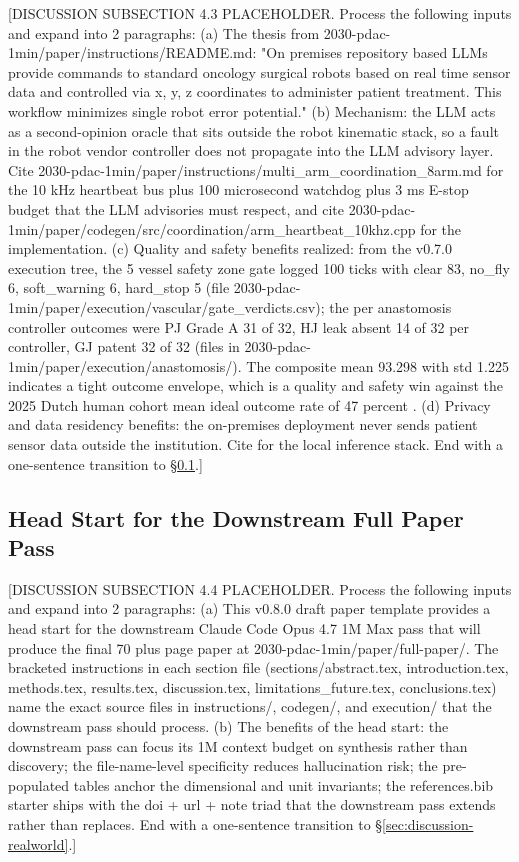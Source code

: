 [DISCUSSION SUBSECTION 4.3 PLACEHOLDER. Process the following inputs and expand into 2 paragraphs:
(a) The thesis from 2030-pdac-1min/paper/instructions/README.md: "On premises repository based LLMs provide commands to standard oncology surgical robots based on real time sensor data and controlled via x, y, z coordinates to administer patient treatment. This workflow minimizes single robot error potential."
(b) Mechanism: the LLM acts as a second-opinion oracle that sits outside the robot kinematic stack, so a fault in the robot vendor controller does not propagate into the LLM advisory layer. Cite 2030-pdac-1min/paper/instructions/multi_arm_coordination_8arm.md for the 10 kHz heartbeat bus plus 100 microsecond watchdog plus 3 ms E-stop budget that the LLM advisories must respect, and cite 2030-pdac-1min/paper/codegen/src/coordination/arm_heartbeat_10khz.cpp for the implementation.
(c) Quality and safety benefits realized: from the v0.7.0 execution tree, the 5 vessel safety zone gate logged 100 ticks with clear 83, no_fly 6, soft_warning 6, hard_stop 5 (file 2030-pdac-1min/paper/execution/vascular/gate_verdicts.csv); the per anastomosis controller outcomes were PJ Grade A 31 of 32, HJ leak absent 14 of 32 per controller, GJ patent 32 of 32 (files in 2030-pdac-1min/paper/execution/anastomosis/). The composite mean 93.298 with std 1.225 indicates a tight outcome envelope, which is a quality and safety win against the 2025 Dutch human cohort mean ideal outcome rate of 47 percent \cite{DutchCohort2025Whipple}.
(d) Privacy and data residency benefits: the on-premises deployment never sends patient sensor data outside the institution. Cite \cite{ollama, vllm} for the local inference stack.
End with a one-sentence transition to \S \ref{sec:discussion-headstart}.]

\subsection{Head Start for the Downstream Full Paper Pass}
\label{sec:discussion-headstart}

[DISCUSSION SUBSECTION 4.4 PLACEHOLDER. Process the following inputs and expand into 2 paragraphs:
(a) This v0.8.0 draft paper template provides a head start for the downstream Claude Code Opus 4.7 1M Max pass that will produce the final 70 plus page paper at 2030-pdac-1min/paper/full-paper/. The bracketed instructions in each section file (sections/abstract.tex, introduction.tex, methods.tex, results.tex, discussion.tex, limitations_future.tex, conclusions.tex) name the exact source files in instructions/, codegen/, and execution/ that the downstream pass should process.
(b) The benefits of the head start: the downstream pass can focus its 1M context budget on synthesis rather than discovery; the file-name-level specificity reduces hallucination risk; the pre-populated tables anchor the dimensional and unit invariants; the references.bib starter ships with the doi + url + note triad that the downstream pass extends rather than replaces.
End with a one-sentence transition to \S \ref{sec:discussion-realworld}.]

